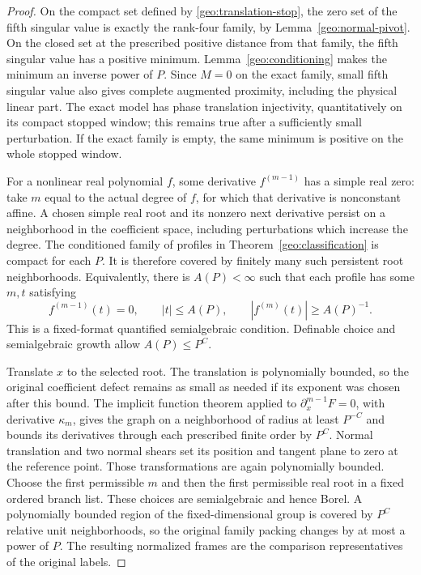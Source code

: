 \documentclass[11pt]{amsart}
\theoremstyle{definition}
\theoremstyle{remark}
\numberwithin{equation}{section}
\begin{document}
\begin{proof}
On the compact set defined by \eqref{geo:translation-stop}, the zero set of the fifth singular value is exactly the rank-four family, by Lemma~\ref{geo:normal-pivot}. On the closed set at the prescribed positive distance from that family, the fifth singular value has a positive minimum. Lemma~\ref{geo:conditioning} makes the minimum an inverse power of $P$. Since $M=0$ on the exact family, small fifth singular value also gives complete augmented proximity, including the physical linear part. The exact model has phase translation injectivity, quantitatively on its compact stopped window; this remains true after a sufficiently small perturbation. If the exact family is empty, the same minimum is positive on the whole stopped window.

For a nonlinear real polynomial $f$, some derivative $f^{(m-1)}$ has a simple real zero: take $m$ equal to the actual degree of $f$, for which that derivative is nonconstant affine. A chosen simple real root and its nonzero next derivative persist on a neighborhood in the coefficient space, including perturbations which increase the degree. The conditioned family of profiles in Theorem~\ref{geo:classification} is compact for each $P$. It is therefore covered by finitely many such persistent root neighborhoods. Equivalently, there is $A(P)<\infty$ such that each profile has some $m,t$ satisfying
\[
f^{(m-1)}(t)=0,\qquad |t|\le A(P),\qquad |f^{(m)}(t)|\ge A(P)^{-1}.
\]
This is a fixed-format quantified semialgebraic condition. Definable choice and semialgebraic growth allow $A(P)\le P^C$.

Translate $x$ to the selected root. The translation is polynomially bounded, so the original coefficient defect remains as small as needed if its exponent was chosen after this bound. The implicit function theorem applied to $\partial_x^{m-1}F=0$, with derivative $\kappa_m$, gives the graph on a neighborhood of radius at least $P^{-C}$ and bounds its derivatives through each prescribed finite order by $P^C$. Normal translation and two normal shears set its position and tangent plane to zero at the reference point. Those transformations are again polynomially bounded. Choose the first permissible $m$ and then the first permissible real root in a fixed ordered branch list. These choices are semialgebraic and hence Borel. A polynomially bounded region of the fixed-dimensional group is covered by $P^C$ relative unit neighborhoods, so the original family packing changes by at most a power of $P$. The resulting normalized frames are the comparison representatives of the original labels.
\end{proof}
\end{document}

